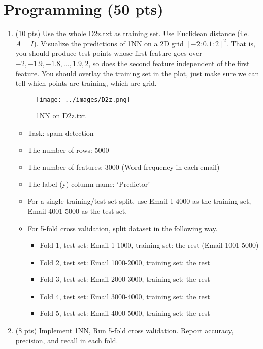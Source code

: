 \documentclass[a4paper]{article}
\theoremstyle{definition}
\newenvironment{soln}{
    \leavevmode\color{blue}\ignorespaces
}{}
\begin{document}
\section{Programming (50 pts)}
\begin{enumerate}
	\item (10 pts) Use the whole D2z.txt as training set.  Use Euclidean distance (i.e. $A=I$).
	Visualize the predictions of 1NN on a 2D grid $[-2:0.1:2]^2$.
	That is, you should produce test points whose first feature goes over $-2, -1.9, -1.8, \ldots, 1.9, 2$, so does the second feature independent of the first feature.
	You should overlay the training set in the plot, just make sure we can tell which points are training, which are grid.
	
	\begin{soln}  
		\begin{figure}[H]
			\centering
			\texttt{[image: ../images/D2z.png]}
			\caption{1NN on D2z.txt}
			\label{fig:1nn}
		\end{figure}
	\end{soln}	

	\begin{itemize}
		\item Task: spam detection
		\item The number of rows: 5000
		\item The number of features: 3000 (Word frequency in each email)
		\item The label (y) column name: `Predictor'
		\item For a single training/test set split, use Email 1-4000 as the training set, Email 4001-5000 as the test set.
		\item For 5-fold cross validation, split dataset in the following way.
		\begin{itemize}
			\item Fold 1, test set: Email 1-1000, training set: the rest (Email 1001-5000)
			\item Fold 2, test set: Email 1000-2000, training set: the rest
			\item Fold 3, test set: Email 2000-3000, training set: the rest
			\item Fold 4, test set: Email 3000-4000, training set: the rest
			\item Fold 5, test set: Email 4000-5000, training set: the rest			
		\end{itemize}
	\end{itemize}
	
	\item (8 pts) Implement 1NN, Run 5-fold cross validation. Report accuracy, precision, and recall in each fold.
	

\end{enumerate}
\end{document}
